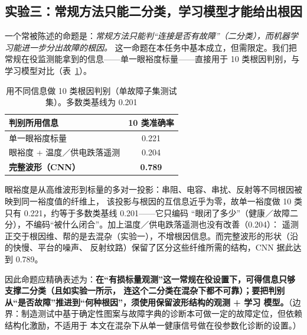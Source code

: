 \documentclass[11pt,a4paper,fontset=mac]{ctexart}
\begin{document}
\subsection{实验三：常规方法只能二分类，学习模型才能给出根因}\label{sec:rootcause}
一个常被陈述的命题是：\emph{常规方法只能判“连接是否有故障”（二分类），而机器学习能进一步分出故障的根因。}
这一命题在本任务中基本成立，但需限定。我们把常规在役监测能拿到的信息——单一眼裕度标量——直接用于
10 类根因判别，与学习模型对比（表~\ref{tab:rootcause}）。

\begin{table}[h]\centering\small
\caption{用不同信息做 10 类根因判别（单故障子集测试集）。多数类基线为 0.201}\label{tab:rootcause}
\begin{tabular}{@{}lc@{}}
\toprule
判别所用信息 & 10 类准确率 \\
\midrule
单一眼裕度标量 & 0.221 \\
眼裕度 + 温度／供电跌落遥测 & 0.204 \\
\textbf{完整波形（CNN）} & \textbf{0.789} \\
\bottomrule
\end{tabular}
\end{table}

眼裕度是从高维波形到标量的多对一投影：串阻、电容、串扰、反射等不同根因被映到同一裕度值的纤维上，
该投影与根因的互信息近乎为零，故单一裕度做 10 类只有 0.221，约等于多数类基线 0.201——它只编码
“眼闭了多少”（健康／故障二分），不编码“被什么闭合”。加上温度／供电跌落遥测也没有改善（0.204）：
遥测正交于根因维、帮的是去混杂（实验一），不增根因信息。而完整波形的形状（沿的快慢、平台的噪声、
反射纹路）保留了区分这些纤维所需的结构，CNN 据此达到 0.789。

因此命题应精确表述为：\textbf{在“有损标量观测”这一常规在役设置下，可得信息只够支撑二分类（且如实验一所示，
连这个二分类在混杂下都不可靠）；要把判别从“是否故障”推进到“何种根因”，须使用保留波形结构的观测 + 学习
模型。}（边界：制造测试中基于确定性图案与故障字典的诊断本可做一定的故障定位，但依赖结构化激励，不适用于
本文在混杂下从单一健康信号做在役参数化诊断的设置。）
\end{document}
